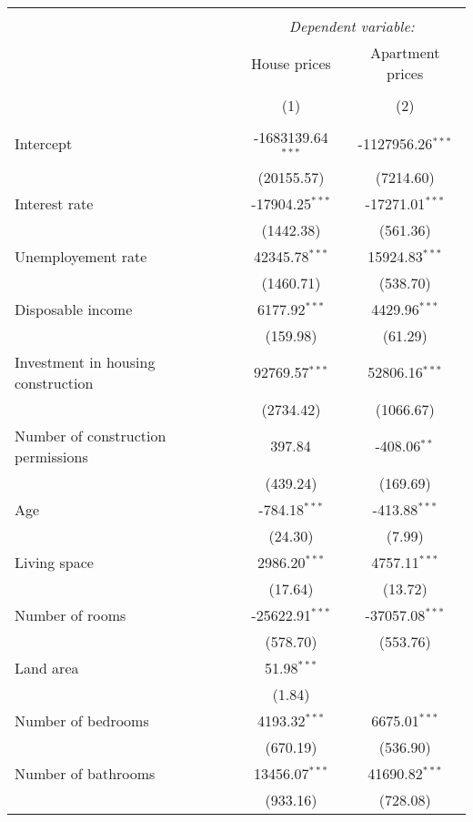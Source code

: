 \begin{table}[!htbp] \centering
\begin{tabular}{@{\extracolsep{5pt}}lcc}
\\[-1.8ex]\hline
\hline \\[-1.8ex]
& \multicolumn{2}{c}{\textit{Dependent variable:}} \
\cr \cline{2-3}
\\[-1.8ex] & \multicolumn{1}{c}{House prices} & \multicolumn{1}{c}{Apartment prices}  \\
\\[-1.8ex] & (1) & (2) \\
\hline \\[-1.8ex]
 Intercept & -1683139.64$^{***}$ & -1127956.26$^{***}$ \\
  & (20155.57) & (7214.60) \\
 Interest rate & -17904.25$^{***}$ & -17271.01$^{***}$ \\
  & (1442.38) & (561.36) \\
 Unemployement rate & 42345.78$^{***}$ & 15924.83$^{***}$ \\
  & (1460.71) & (538.70) \\
 Disposable income & 6177.92$^{***}$ & 4429.96$^{***}$ \\
  & (159.98) & (61.29) \\
 Investment in housing construction & 92769.57$^{***}$ & 52806.16$^{***}$ \\
  & (2734.42) & (1066.67) \\
 Number of construction permissions & 397.84$^{}$ & -408.06$^{**}$ \\
  & (439.24) & (169.69) \\
 Age & -784.18$^{***}$ & -413.88$^{***}$ \\
  & (24.30) & (7.99) \\
 Living space & 2986.20$^{***}$ & 4757.11$^{***}$ \\
  & (17.64) & (13.72) \\
 Number of rooms & -25622.91$^{***}$ & -37057.08$^{***}$ \\
  & (578.70) & (553.76) \\
 Land area & 51.98$^{***}$ & \\
  & (1.84) & \\
 Number of bedrooms & 4193.32$^{***}$ & 6675.01$^{***}$ \\
  & (670.19) & (536.90) \\
 Number of bathrooms & 13456.07$^{***}$ & 41690.82$^{***}$ \\
  & (933.16) & (728.08) \\

\end{tabular}
\end{table}
